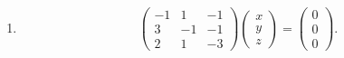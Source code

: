 {\begin{enumerate}
Show that the vectors
\begin{equation*}
 {\bf x_1}=
 \begin{pmatrix}
  -9 \\ 7 \\ 10
 \end{pmatrix}
\hspace{10pt}\text{and}\hspace{10pt}
 {\bf x_2} =
 \begin{pmatrix}
  -3 \\ \frac{7}{3} \\ \frac{10}{3}
 \end{pmatrix}
\end{equation*}
are solutions of this system. By explicit calculation, verify whether ${\bf x_1}+{\bf x_2}$ is also solution.

 \item \begin{equation*}
\begin{pmatrix}
 -1 & 1 & -1 \\
 3 & -1 & -1 \\
 2 & 1 & -3
\end{pmatrix}
 \begin{pmatrix}
  x \\ y \\ z
 \end{pmatrix}
=
\begin{pmatrix}
 0 \\ 0 \\ 0
\end{pmatrix}.
\end{equation*}
\end{enumerate}
}

